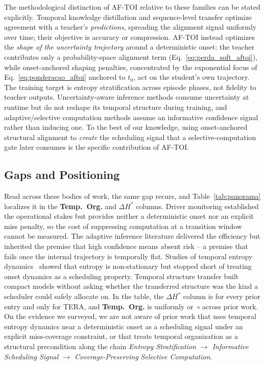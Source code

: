 \documentclass[a4paper,fleqn]{cas-dc}
\begin{document}
{\color{\revcolor}The methodological distinction of \mbox{AF-TOI} relative to these
families can be stated explicitly. Temporal knowledge distillation and
sequence-level transfer optimize agreement with a teacher's
\emph{predictions}, spreading the alignment signal uniformly over time; their
objective is accuracy or compression. \mbox{AF-TOI} instead optimizes the
\emph{shape of the uncertainty trajectory} around a deterministic onset: the
teacher contributes only a probability-space alignment term
(Eq.~\ref{eq:perda_soft_aftoi}), while onset-anchored shaping penalties,
concentrated by the exponential focus of Eq.~\ref{eq:ponderacao_aftoi}
anchored to $t_0$, act on the student's own trajectory. The training target is
entropy stratification across episode phases, not fidelity to teacher
outputs. Uncertainty-aware inference methods consume
uncertainty at runtime but do not reshape its temporal structure during
training, and adaptive/selective computation methods assume an informative
confidence signal rather than inducing one. To the best of our knowledge,
using onset-anchored structural alignment to \emph{create} the scheduling
signal that a selective-computation gate later consumes is the specific
contribution of \mbox{AF-TOI}.}
\subsection{Gaps and Positioning}
\label{sec:rel_gap}
Read across these bodies of work, the same gap recurs, and Table~\ref{tab:panorama}
localizes it in the \textbf{Temp.~Org.} and \textbf{$\Delta H^{\ast}$} columns. Driver
monitoring established the operational stakes but provides neither a
deterministic onset nor an explicit miss penalty, so the cost of suppressing
computation at a transition window cannot be measured. The adaptive inference
literature delivered the efficiency but inherited the premise that high confidence
means absent risk -- a premise that fails once the internal trajectory is
temporally flat. Studies of temporal entropy
dynamics~\cite{braverman2020calib,dera2023trust}
showed that entropy is non-stationary but stopped short of treating onset
dynamics as a scheduling property. Temporal
structure transfer built compact models without asking whether the transferred
structure was the kind a scheduler could safely allocate on. In the table, the
\textbf{$\Delta H^{\ast}$} column is  for every prior entry and
 only for TERA, and \textbf{Temp.~Org.} is uniformly  or~$\circ$
across prior work. On the evidence we surveyed, we are not aware of prior work that
uses temporal entropy dynamics near a deterministic onset as a scheduling signal
under an explicit miss-coverage constraint, or that treats temporal organization as
a structural precondition along the chain
\emph{Entropy Stratification $\rightarrow$ Informative Scheduling Signal $\rightarrow$
Coverage-Preserving Selective Computation}.
\end{document}
